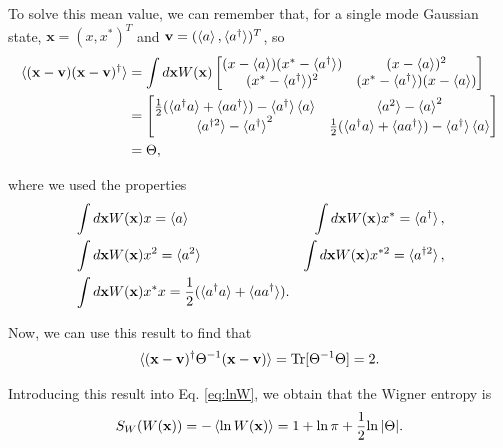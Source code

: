 \begin{apendicesenv}
\noindent To solve this mean value, we can remember that, for a single mode Gaussian state, $\mathbf{x} = (x, x^*)^T$ and $\mathbf{v} = (\braket{a}, \braket{a^\dagger})^T$, so
\begin{equation}
    \begin{split}
        \braket{(\mathbf{x} - \mathbf{v})(\mathbf{x} - \mathbf{v})^\dagger} &= \int d\mathbf{x} W(\mathbf{x})
        \begin{bmatrix}
            (x - \braket{a})(x^* - \braket{a^\dagger}) & (x - \braket{a})^2\\
            (x^* - \braket{a^\dagger})^2 & (x^* - \braket{a^\dagger})(x - \braket{a})
        \end{bmatrix}\\
        &= \begin{bmatrix}
        \frac{1}{2}(\braket{{a}^\dagger {a}} + \braket{{a} {a}^\dagger}) - \braket{{a}^\dagger} \braket{{a}} & \braket{{a}^2} - \braket{{a}}^2\\
        \braket{{a}^{\dagger 2}} - \braket{{a}^\dagger}^2 & \frac{1}{2}(\braket{{a}^\dagger {a}} + \braket{{a} {a}^\dagger}) - \braket{{a}^\dagger} \braket{{a}}
    \end{bmatrix}\\
    &= \Theta,
    \end{split}
\end{equation}

\noindent where we used the properties
\begin{align}
    &\int d\mathbf{x} W(\mathbf{x}) x = \braket{a} & \int d\mathbf{x} W(\mathbf{x}) x^* = \braket{a^\dagger},
    \label{eq:pW-1}\\
    &\int d\mathbf{x} W(\mathbf{x}) x^2 = \braket{a^2} & \int d\mathbf{x} W(\mathbf{x}) x^{*2} = \braket{a^{\dagger2}},
    \label{eq:pW-2}\\
    &\int d\mathbf{x} W(\mathbf{x}) x^* x = \frac{1}{2}(\braket{a^\dagger a} + \braket{a a^\dagger}).
    \label{eq:pW-3}
\end{align}

\noindent Now, we can use this result to find that
\begin{equation}
    \braket{(\mathbf{x} - \mathbf{v})^\dagger \Theta^{-1} (\mathbf{x} - \mathbf{v})} = \text{Tr}[ \Theta^{-1} \Theta] = 2.
\end{equation}

\noindent Introducing this result into Eq. \eqref{eq:lnW}, we obtain that the Wigner entropy is
\begin{equation}
    S_W(W(\mathbf{x})) = -\braket{\ln W(\mathbf{x})} = 1 + {\ln \pi} + \frac{1}{2} {\ln |\Theta|}.
    \label{eq:Sw-forma-final}
\end{equation}


\end{apendicesenv}
